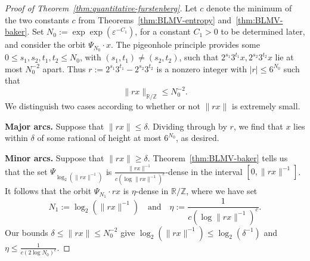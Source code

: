 \documentclass[10pt,a4paper]{amsart}
\newcommand{\R}{{\mathbb R}}
\newcommand{\Z}{{\mathbb Z}}
\begin{document}
\begin{proof}[Proof of Theorem~\ref{thm:quantitative-furstenberg}]
Let $c$ denote the minimum of the two constants $c$ from Theorems~\ref{thm:BLMV-entropy} and~\ref{thm:BLMV-baker}.  Set $N_0:=\exp\exp(\varepsilon^{-C_1})$, for a constant $C_1>0$ to be determined later, and consider the orbit $\Psi_{N_0} \cdot x$.  The pigeonhole principle provides some $0 \leq s_1,s_2,t_1,t_2 \leq N_0$, with $(s_1,t_1) \neq (s_2,t_2)$, such that $2^{s_1} 3^{t_1} x,2^{s_2}3^{t_2}x$ lie at most $N_0^{-2}$ apart.  Thus $r:=2^{s_1} 3^{t_1} -2^{s_2}3^{t_2}$ is a nonzero integer with $|r| \leq 6^{N_0}$ such that
$$\|rx\|_{\mathbb{R}/\mathbb{Z}} \leq N_0^{-2}.$$
We distinguish two cases according to whether or not $\|rx\|$ is extremely small.

{\bf Major arcs.} Suppose that $\|rx\| \leq \delta$.  Dividing through by $r$, we find that $x$ lies within $\delta$ of some rational of height at most $6^{N_0}$, as desired.

{\bf Minor arcs.} Suppose that $\|rx\| \geq \delta$.  Theorem~\ref{thm:BLMV-baker} tells us that the set $\Psi_{\log_2(\|rx\|^{-1})}$ is $\frac{\|rx\|^{-1}}{c(\log \|rx\|^{-1})^c}$-dense in the interval $[0,\|rx\|^{-1}]$.  It follows that the orbit $\Psi_{N_1} \cdot rx$ is $\eta$-dense in $\R/\Z$, where we have set $$N_1:=\log_2(\|rx\|^{-1}) \quad \text{and} \quad \eta:=\frac{1}{c(\log \|rx\|^{-1})^c}.$$  Our bounds $\delta \leq \|rx\| \leq N_0^{-2}$ give $\log_2(\|rx\|^{-1}) \leq \log_2(\delta^{-1})$ and $\eta \leq \frac{1}{c(2 \log N_0)^c}$.



\end{proof}
\end{document}
